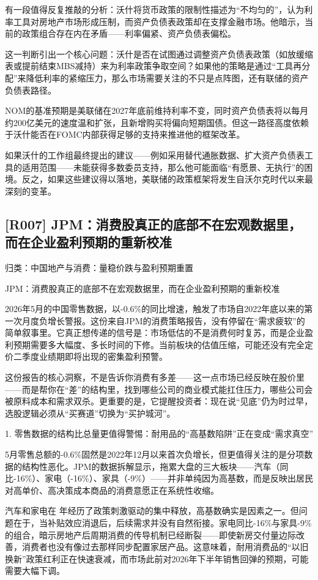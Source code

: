 \documentclass[11pt]{ctexart}
\begin{document}
有一段值得反复推敲的分析：沃什将货币政策的限制性描述为“不均匀的”，认为利率工具对房地产市场形成压制，而资产负债表政策却在支撑金融市场。他暗示，当前的政策组合存在内在矛盾——利率偏紧、资产负债表偏松。

这一判断引出一个核心问题：沃什是否在试图通过调整资产负债表政策（如放缓缩表或提前结束MBS减持）来为利率政策争取空间？如果他的策略是通过“工具再分配”来降低利率的紧缩压力，那么市场需要关注的不只是点阵图，还有联储的资产负债表路径。

NOM的基准预期是美联储在2027年底前维持利率不变，同时资产负债表将以每月约200亿美元的速度温和扩张，且新增购买将偏向短期国债。但这一路径高度依赖于沃什能否在FOMC内部获得足够的支持来推进他的框架改革。

如果沃什的工作组最终提出的建议——例如采用替代通胀数据、扩大资产负债表工具的适用范围——未能获得多数委员支持，那么他可能面临“有愿景、无执行”的困境。反之，如果这些建议得以落地，美联储的政策框架将发生自沃尔克时代以来最深刻的变革。

\subsection{[R007] JPM：消费股真正的底部不在宏观数据里，而在企业盈利预期的重新校准}
{\small\color{refgray}归类：中国地产与消费：量稳价跌与盈利预期重置}

JPM：消费股真正的底部不在宏观数据里，而在企业盈利预期的重新校准

2026年5月的中国零售数据，以-0.6\%的同比增速，触发了市场自2022年底以来的第一次月度负增长警报。这份来自JPM的消费策略报告，没有停留在“需求疲软”的简单叙事里。它真正想传递的信号是：市场低估的不是消费何时复苏，而是企业盈利预期需要多大幅度、多长时间的下修。当前板块的估值压缩，可能还没有完全定价二季度业绩期即将出现的密集盈利预警。

这份报告的核心洞察，不是告诉你消费有多差——这一点市场已经反映在股价里——而是帮你在“差”的结构里，找到哪些公司的商业模式能扛住压力，哪些公司会被原料成本和需求双杀。更重要的是，它提醒投资者：现在说“见底”仍为时过早，选股逻辑必须从“买赛道”切换为“买护城河”。

1. 零售数据的结构比总量更值得警惕：耐用品的“高基数陷阱”正在变成“需求真空”

5月零售总额的-0.6\%固然是2022年12月以来首次负增长，但更值得关注的是分项数据的结构性恶化。JPM的数据拆解显示，拖累大盘的三大板块——汽车（同比-16\%）、家电（-16\%）、家具（-9\%）——并非单纯因为高基数，而是反映出居民对高单价、高决策成本商品的消费意愿正在系统性收缩。

汽车和家电在 年经历了政策刺激驱动的集中释放，高基数确实是因素之一。但问题在于，当补贴效应消退后，后续需求并没有自然衔接。家电同比-16\%与家具-9\%的组合，暗示房地产后周期消费的传导机制已经断裂——即使新房交付量边际改善，消费者也没有像过去那样同步配置家居产品。这意味着，耐用消费品的“以旧换新”政策红利正在快速衰减，而市场此前对2026年下半年销售回弹的预期，可能需要大幅下调。
\end{document}
